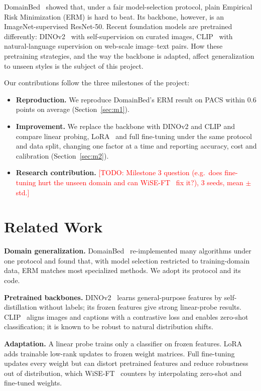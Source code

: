 \documentclass[conference]{IEEEtran}
\newcommand{\todo}[1]{\textcolor{red}{[TODO: #1]}}
\begin{document}
DomainBed~\cite{gulrajani2021domainbed} showed that, under a fair model-selection protocol, plain Empirical Risk Minimization (ERM) is hard to beat. Its backbone, however, is an ImageNet-supervised ResNet-50. Recent foundation models are pretrained differently: DINOv2~\cite{oquab2023dinov2} with self-supervision on curated images, CLIP~\cite{radford2021clip} with natural-language supervision on web-scale image--text pairs. How these pretraining strategies, and the way the backbone is adapted, affect generalization to unseen styles is the subject of this project.

Our contributions follow the three milestones of the project:
\begin{itemize}
  \item \textbf{Reproduction.} We reproduce DomainBed's ERM result on PACS within 0.6 points on average (Section~\ref{sec:m1}).
  \item \textbf{Improvement.} We replace the backbone with DINOv2 and CLIP and compare linear probing, LoRA~\cite{hu2022lora} and full fine-tuning under the same protocol and data split, changing one factor at a time and reporting accuracy, cost and calibration (Section~\ref{sec:m2}).
  \item \textbf{Research contribution.} \todo{Milestone 3 question (e.g.\ does fine-tuning hurt the unseen domain and can WiSE-FT~\cite{wortsman2022wiseft} fix it?), 3 seeds, mean $\pm$ std.}
\end{itemize}

\section{Related Work}
\textbf{Domain generalization.} DomainBed~\cite{gulrajani2021domainbed} re-implemented many algorithms under one protocol and found that, with model selection restricted to training-domain data, ERM matches most specialized methods. We adopt its protocol and its code.

\textbf{Pretrained backbones.} DINOv2~\cite{oquab2023dinov2} learns general-purpose features by self-distillation without labels; its frozen features give strong linear-probe results. CLIP~\cite{radford2021clip} aligns images and captions with a contrastive loss and enables zero-shot classification; it is known to be robust to natural distribution shifts.

\textbf{Adaptation.} A linear probe trains only a classifier on frozen features. LoRA~\cite{hu2022lora} adds trainable low-rank updates to frozen weight matrices. Full fine-tuning updates every weight but can distort pretrained features and reduce robustness out of distribution, which WiSE-FT~\cite{wortsman2022wiseft} counters by interpolating zero-shot and fine-tuned weights.
\end{document}
